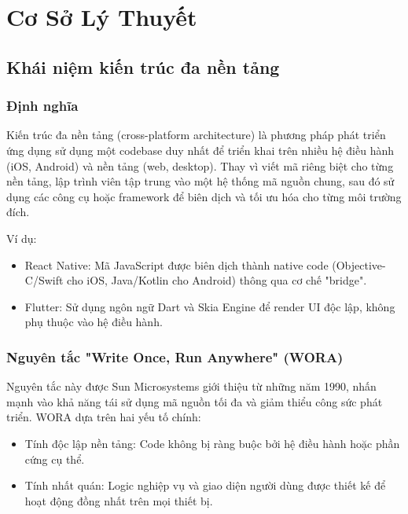 \section{Cơ Sở Lý Thuyết }

\subsection{Khái niệm kiến trúc đa nền tảng}
\renewcommand{\labelitemi}{--}    
\begin{flushleft}
  \subsubsection{Định nghĩa}
    \begin{flushleft}
      \hspace*{0.8cm}Kiến trúc đa nền tảng (cross-platform architecture) là phương pháp phát triển ứng dụng sử dụng một codebase duy nhất để triển khai trên nhiều hệ điều hành (iOS, Android) và nền tảng (web, desktop). Thay vì viết mã riêng biệt cho từng nền tảng, lập trình viên tập trung vào một hệ thống mã nguồn chung, sau đó sử dụng các công cụ hoặc framework để biên dịch và tối ưu hóa cho từng môi trường đích.
    \end{flushleft}

    \begin{flushleft}
      \hspace*{0.8cm}Ví dụ:
      \setlength{\leftmargini}{1.5cm}
      \begin{itemize}
          \item React Native: Mã JavaScript được biên dịch thành native code (Objective-C/Swift cho iOS, Java/Kotlin cho Android) thông qua cơ chế "bridge".
          \item Flutter: Sử dụng ngôn ngữ Dart và Skia Engine để render UI độc lập, không phụ thuộc vào hệ điều hành.
      \end{itemize}
    \end{flushleft}

  \subsubsection{Nguyên tắc "Write Once, Run Anywhere" (WORA)}
    \begin{flushleft}
      \hspace*{0.8cm}Nguyên tắc này được Sun Microsystems giới thiệu từ những năm 1990, nhấn mạnh vào khả năng tái sử dụng mã nguồn tối đa và giảm thiểu công sức phát triển. WORA dựa trên hai yếu tố chính:
      \setlength{\leftmargini}{1.5cm}
      \begin{itemize}
        \item Tính độc lập nền tảng: Code không bị ràng buộc bởi hệ điều hành hoặc phần cứng cụ thể.
        \item Tính nhất quán: Logic nghiệp vụ và giao diện người dùng được thiết kế để hoạt động đồng nhất trên mọi thiết bị.
      \end{itemize}
    \end{flushleft}


\end{flushleft}
